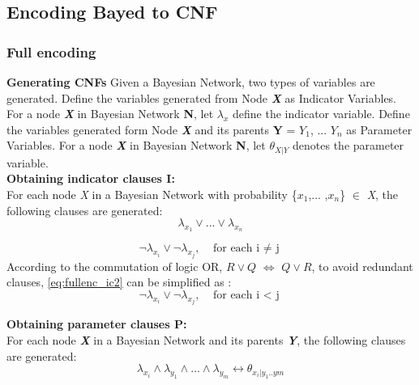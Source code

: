     \subsection{Encoding Bayed to CNF}
        \subsubsection{Full encoding}
            \textbf{Generating CNFs}
            \newline
            Given a Bayesian Network, two types of variables are generated.
            Define the variables generated from Node \textbf{\textit{X}} as Indicator Variables.
            For a node \textbf{\textit{X}} in Bayesian Network \textbf{N}, let $\lambda_x$ define the indicator variable. 
            Define the variables generated form Node \textbf{\textit{X}} and its parents \textbf{Y} = {$Y_{1}$, ... $Y_{n}$} as Parameter Variables.
            For a node \textbf{\textit{X}} in Bayesian Network \textbf{N}, let $\theta_{X|Y}$ denotes the parameter variable.\\
            
            \textbf{Obtaining indicator clauses \textsc{I}:}\\
            For each node \textit{X} in a Bayesian Network with probability \{$x_{1}$,... ,$x_{n}$\} $\in$ \textit{X}, the following clauses are generated:
            \begin{equation}\label{fullenc_ic1}
                \lambda_{x_{1}} \vee ... \vee \lambda_{x_{n}}
            \end{equation}
            
            \begin{equation}\label{eq:fullenc_ic2}
                \neg\lambda_{x_{i}} \vee \neg\lambda_{x_{j}}, \;\;\; \mbox{for each i $\neq$ j}
            \end{equation}
            According to the commutation of logic OR, $R \vee Q$ $\Longleftrightarrow$ $Q \vee R$, to avoid redundant clauses, \ref{eq:fullenc_ic2} can be simplified as :
            \begin{equation}\label{fullenc_ic3}
                \neg\lambda_{x_{i}} \vee \neg\lambda_{x_{j}}, \;\;\; \mbox{for each i $<$ j}
            \end{equation}
            
            \textbf{Obtaining parameter clauses \textsc{P}:}\\
            For each node \textbf{\textit{X}} in a Bayesian Network and its parents \textbf{\textit{Y}}, the following clauses are generated:
            \begin{equation}\label{fullenc_pc1}
                \lambda_{x_{i}} \wedge \lambda_{y_{1}} \wedge... \wedge \lambda_{y_{m}} \leftrightarrow \theta_{x_{i}|y_{1}..y{m}}
            \end{equation}
            
